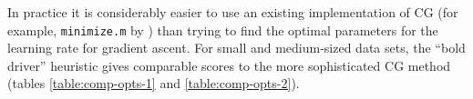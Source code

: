 	In practice it is considerably easier to  use an existing implementation of CG (for example, \texttt{minimize.m} by \citealp{rasmussen-online}) than trying to find the optimal parameters for the learning rate for gradient ascent. For small and medium-sized data sets, the ``bold driver'' heuristic gives comparable scores to the more sophisticated CG method (tables \ref{table:comp-opts-1} and \ref{table:comp-opts-2}).
	


